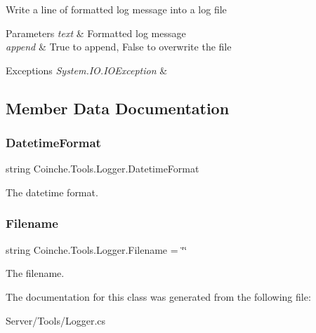 Write a line of formatted log message into a log file 


\begin{DoxyParams}{Parameters}
{\em text} & Formatted log message\\
\hline
{\em append} & True to append, False to overwrite the file\\
\hline
\end{DoxyParams}

\begin{DoxyExceptions}{Exceptions}
{\em System.\+I\+O.\+I\+O\+Exception} & \\
\hline
\end{DoxyExceptions}


\subsection{Member Data Documentation}
\mbox{\label{class_coinche_1_1_tools_1_1_logger_a3f00d015e0ea9978712a23abac8511b1}} 
\subsubsection{\texorpdfstring{Datetime\+Format}{DatetimeFormat}}
{\footnotesize\ttfamily string Coinche.\+Tools.\+Logger.\+Datetime\+Format\hspace{0.3cm}{\ttfamily [private]}}



The datetime format. 

\mbox{\label{class_coinche_1_1_tools_1_1_logger_ab5055f470ac8880f10cf72f4ba6709f2}} 
\subsubsection{\texorpdfstring{Filename}{Filename}}
{\footnotesize\ttfamily string Coinche.\+Tools.\+Logger.\+Filename = \char`\"{}\char`\"{}\hspace{0.3cm}{\ttfamily [private]}}



The filename. 



The documentation for this class was generated from the following file\+:\begin{DoxyCompactItemize}
\item 
Server/\+Tools/Logger.\+cs\end{DoxyCompactItemize}
